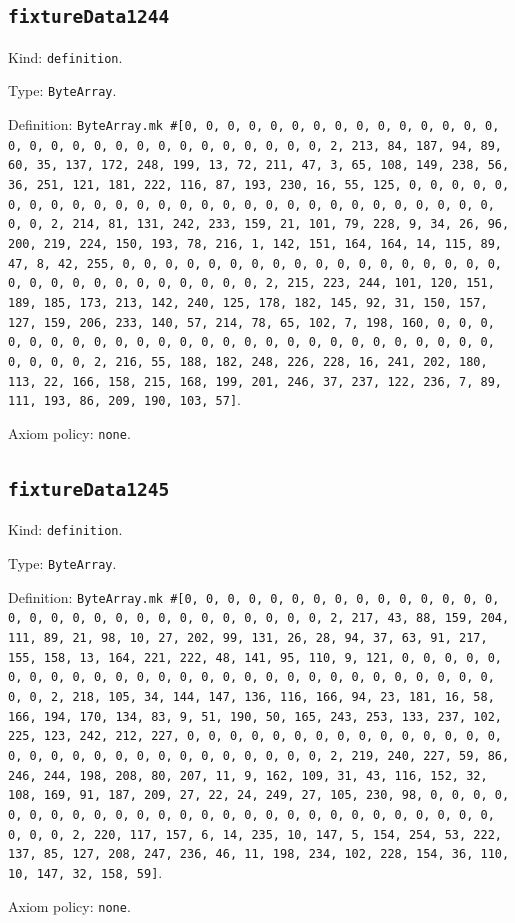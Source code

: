 \documentclass[11pt]{article}
\begin{document}
\subsection*{\texttt{fixtureData1244}}
\noindent Kind: \texttt{definition}.\par
\noindent Type: \texttt{ByteArray}.\par
\noindent Definition: \texttt{ByteArray.mk \#[0, 0, 0, 0, 0, 0, 0, 0, 0, 0, 0, 0, 0, 0, 0, 0, 0, 0, 0, 0, 0, 0, 0, 0, 0, 0, 0, 0, 0, 0, 2, 213, 84, 187, 94, 89, 60, 35, 137, 172, 248, 199, 13, 72, 211, 47, 3, 65, 108, 149, 238, 56, 36, 251, 121, 181, 222, 116, 87, 193, 230, 16, 55, 125, 0, 0, 0, 0, 0, 0, 0, 0, 0, 0, 0, 0, 0, 0, 0, 0, 0, 0, 0, 0, 0, 0, 0, 0, 0, 0, 0, 0, 0, 0, 2, 214, 81, 131, 242, 233, 159, 21, 101, 79, 228, 9, 34, 26, 96, 200, 219, 224, 150, 193, 78, 216, 1, 142, 151, 164, 164, 14, 115, 89, 47, 8, 42, 255, 0, 0, 0, 0, 0, 0, 0, 0, 0, 0, 0, 0, 0, 0, 0, 0, 0, 0, 0, 0, 0, 0, 0, 0, 0, 0, 0, 0, 0, 0, 2, 215, 223, 244, 101, 120, 151, 189, 185, 173, 213, 142, 240, 125, 178, 182, 145, 92, 31, 150, 157, 127, 159, 206, 233, 140, 57, 214, 78, 65, 102, 7, 198, 160, 0, 0, 0, 0, 0, 0, 0, 0, 0, 0, 0, 0, 0, 0, 0, 0, 0, 0, 0, 0, 0, 0, 0, 0, 0, 0, 0, 0, 0, 0, 2, 216, 55, 188, 182, 248, 226, 228, 16, 241, 202, 180, 113, 22, 166, 158, 215, 168, 199, 201, 246, 37, 237, 122, 236, 7, 89, 111, 193, 86, 209, 190, 103, 57]}.\par
\noindent Axiom policy: \texttt{none}.\par
\subsection*{\texttt{fixtureData1245}}
\noindent Kind: \texttt{definition}.\par
\noindent Type: \texttt{ByteArray}.\par
\noindent Definition: \texttt{ByteArray.mk \#[0, 0, 0, 0, 0, 0, 0, 0, 0, 0, 0, 0, 0, 0, 0, 0, 0, 0, 0, 0, 0, 0, 0, 0, 0, 0, 0, 0, 0, 0, 2, 217, 43, 88, 159, 204, 111, 89, 21, 98, 10, 27, 202, 99, 131, 26, 28, 94, 37, 63, 91, 217, 155, 158, 13, 164, 221, 222, 48, 141, 95, 110, 9, 121, 0, 0, 0, 0, 0, 0, 0, 0, 0, 0, 0, 0, 0, 0, 0, 0, 0, 0, 0, 0, 0, 0, 0, 0, 0, 0, 0, 0, 0, 0, 2, 218, 105, 34, 144, 147, 136, 116, 166, 94, 23, 181, 16, 58, 166, 194, 170, 134, 83, 9, 51, 190, 50, 165, 243, 253, 133, 237, 102, 225, 123, 242, 212, 227, 0, 0, 0, 0, 0, 0, 0, 0, 0, 0, 0, 0, 0, 0, 0, 0, 0, 0, 0, 0, 0, 0, 0, 0, 0, 0, 0, 0, 0, 0, 2, 219, 240, 227, 59, 86, 246, 244, 198, 208, 80, 207, 11, 9, 162, 109, 31, 43, 116, 152, 32, 108, 169, 91, 187, 209, 27, 22, 24, 249, 27, 105, 230, 98, 0, 0, 0, 0, 0, 0, 0, 0, 0, 0, 0, 0, 0, 0, 0, 0, 0, 0, 0, 0, 0, 0, 0, 0, 0, 0, 0, 0, 0, 0, 2, 220, 117, 157, 6, 14, 235, 10, 147, 5, 154, 254, 53, 222, 137, 85, 127, 208, 247, 236, 46, 11, 198, 234, 102, 228, 154, 36, 110, 10, 147, 32, 158, 59]}.\par
\noindent Axiom policy: \texttt{none}.\par
\end{document}
